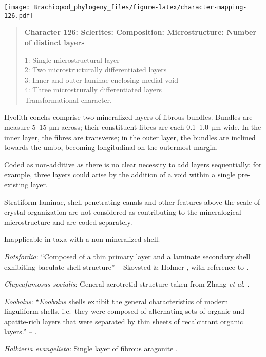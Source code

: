 \documentclass[openany]{book}
\theoremstyle{definition}
\theoremstyle{definition}
\theoremstyle{definition}
\theoremstyle{remark}
\begin{document}
\texttt{[image: Brachiopod\_phylogeny\_files/figure-latex/character-mapping-126.pdf]}

\begin{quote}
\textbf{Character 126: Sclerites: Composition: Microstructure: Number of
distinct layers}

1: Single microstructural layer\\
2: Two microstructurally differentiated layers\\
3: Inner and outer laminae enclosing medial void\\
4: Three microstrurally differentiated layers\\
Transformational character.
\end{quote}

Hyolith conchs comprise two mineralized layers of fibrous bundles.
Bundles are measure 5--15 µm across; their constituent fibres are each
0.1--1.0 µm wide. In the inner layer, the fibres are transverse; in the
outer layer, the bundles are inclined towards the umbo, becoming
longitudinal on the outermost margin.

Coded as non-additive as there is no clear necessity to add layers
sequentially: for example, three layers could arise by the addition of a
void within a single pre-existing layer.

Stratiform laminae, shell-penetrating canals and other features above
the scale of crystal organization are not considered as contributing to
the mineralogical microstructure and are coded separately.

Inapplicable in taxa with a non-mineralized shell.

\hypertarget{Botsfordia-coding-126}{}
\emph{Botsfordia}: ``Composed of a thin primary layer and a laminate
secondary shell exhibiting baculate shell structure'' -- Skovsted \&
Holmer \citeyearpar{Skovsted2005EarlyCambrian}, with reference to
\citet{Skovsted2003EarlyCambrian}.

\hypertarget{Clupeafumosus_socialis-coding-126}{}
\emph{Clupeafumosus socialis}: General acrotretid structure taken from
Zhang \emph{et al}. \citeyearpar{Zhang2016Epithelialcell}.

\hypertarget{Eoobolus-coding-126}{}
\emph{Eoobolus}: ``\emph{Eoobolus} shells exhibit the general
characteristics of modern linguliform shells, i.e.~they were composed of
alternating sets of organic and apatite-rich layers that were separated
by thin sheets of recalcitrant organic layers.'' --
\citet{Balthasar2007Anearly}.

\hypertarget{Halkieria_evangelista-coding-126}{}
\emph{Halkieria evangelista}: Single layer of fibrous aragonite
\citep{Porter2008}.
\end{document}
